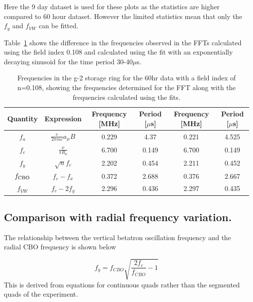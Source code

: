 Here the 9 day dataset is used for these plots as the statistics are higher compared to 60 hour dataset. However the limited statistics mean that only the $f_{y}$ and $f_{VW}$ can be fitted.

Table~\ref{table:frequencies} shows the difference in the frequencies observed in the FFTs calculated using the field index 0.108 and calculated using the fit with an exponentially decaying sinusoid for the time period 30-40$\mu$s.

\begin{table}[ht]
\begin{center}
 \begin{tabular}{||c | c | c | c | c | c||} 
 \hline
 Quantity & Expression & Frequency [MHz] & Period [$\mu$s] & Frequency [MHz] & Period [$\mu$s] \\ [0.5ex] 
 \hline\hline
 $f_{a}$ & $\frac{e}{2\pi{mc}}a_{\mu}B$ & 0.229 & 4.37 & 0.221 & 4.525\\ 
 \hline
 $f_{c}$ & $\frac{\nu}{\pi{R_0}}$ & 6.700 & 0.149 & 6.700 & 0.149 \\
 \hline
 $f_{y}$ & $\sqrt{n}f_{c}$ & 2.202 & 0.454 & 2.211 & 0.452 \\
 \hline
 $f_{\rm CBO}$ & $f_{c} - f_{x}$ & 0.372 & 2.688 & 0.376 & 2.667\\ 
 \hline
 $f_{VW}$ & $f_{c} - 2f_{y}$ & 2.296 & 0.436 & 2.297 & 0.435\\ 
 \hline
\end{tabular}
\caption{Frequencies in the g-2 storage ring for the 60hr data with a field index of n=0.108, showing the frequencies determined for the FFT along with the frequencies calculated using the fits.}
\label{table:frequencies}
\end{center}
\end{table}

\subsection{Comparison with radial frequency variation.}

The relationship between the vertical betatron oscillation frequency and the radial CBO frequency is shown below

\begin{equation}
f_{y} = f_{CBO}\sqrt{\frac{2f_{c}}{f_{CBO}}-1}
\end{equation}
This is derived from equations for continuous quads rather than the segmented quads of the experiment. 

